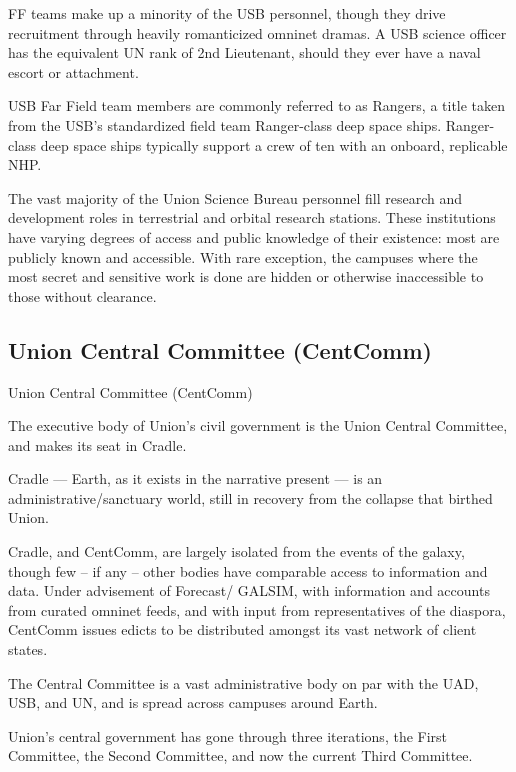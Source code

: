 FF teams make up a minority of the USB personnel, though they drive recruitment through  
heavily romanticized omninet dramas. A USB science officer has the equivalent UN rank of 2nd  
Lieutenant, should they ever have a naval escort or attachment. 
 

USB Far Field team members are commonly referred to as Rangers, a title taken from the USB’s  
standardized field team Ranger-class deep space ships. Ranger-class deep space ships typically  
support a crew of ten with an onboard, replicable NHP.  
 

The vast majority of the Union Science Bureau personnel fill research and development roles in  
terrestrial and orbital research stations. These institutions have varying degrees of access and  
public knowledge of their existence: most are publicly known and accessible. With rare  
exception, the campuses where the most secret and sensitive work is done are hidden or  
otherwise inaccessible to those without clearance. 
 
 
\subsection{Union Central Committee (CentComm)}

Union Central Committee (CentComm)  

The executive body of Union’s civil government is the Union Central Committee, and makes its  
seat in Cradle. 
 

Cradle — Earth, as it exists in the narrative present — is an administrative/sanctuary world, still  
in recovery from the collapse that birthed Union. 
 

                                                                                                                     


Cradle, and CentComm, are largely isolated from the events of the galaxy, though few -- if any --  
other bodies have comparable access to information and data. Under advisement of Forecast/ 
GALSIM, with information and accounts from curated omninet feeds, and with input from  
representatives of the diaspora, CentComm issues edicts to be distributed amongst its vast  
network of client states. 
 

The Central Committee  is a vast administrative body on par with the UAD, USB, and UN, and is  
spread across campuses around Earth. 
 

Union’s central government has gone through three iterations, the First Committee, the Second  
Committee, and now the current Third Committee.  
 
